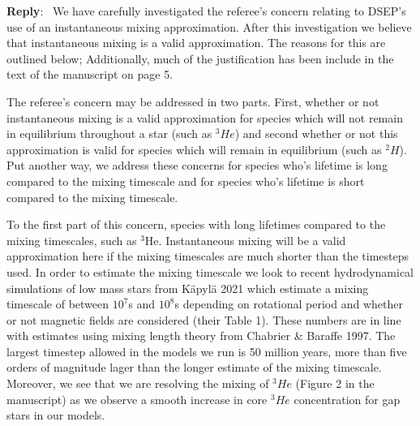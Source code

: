 \documentclass[11pt]{article}
\newcounter{reviewer}
\newcounter{point}[reviewer]
\newenvironment{reply}
   {\medskip \noindent \begin{sf}\textbf{Reply}:\  }
   {\medskip \end{sf}}
\begin{document}
\begin{reply}
	We have carefully investigated the referee's concern relating to DSEP's
	use of an instantaneous mixing approximation. After this investigation
	we believe that instantaneous mixing is a valid approximation. The reasons
	for this are outlined below; Additionally, much of the justification has been
	include in the text of the manuscript on page 5.


	The referee's concern may be addressed in two parts. First, whether or not
	instantaneous mixing is a valid approximation for species which will not
	remain in equilibrium throughout a star (such as $^{3}He$) and second
	whether or not this approximation is valid for species which will remain in
	equilibrium (such as $^{2}H$). Put another way, we address these concerns
	for species who's lifetime is long compared to the mixing timescale and for
	species who's lifetime is short compared to the mixing timescale. 

	To the first part of this concern, species with long lifetimes compared to
	the mixing timescales, such as $^{3}$He. Instantaneous mixing will be a
	valid approximation here if the mixing timescales are much shorter than the
	timesteps used. In order to estimate the mixing timescale we look to recent
	hydrodynamical simulations of low mass stars from K\"apyl\"a 2021 which
	estimate a mixing timescale of between $10^{7}$s and $10^{8}$s depending on
	rotational period and whether or not magnetic fields are considered (their
	Table 1). These numbers are in line with estimates using mixing length
	theory from Chabrier \& Baraffe 1997. The largest timestep allowed in the
	models we run is 50 million years, more than five orders of magnitude lager
	than the longer estimate of the mixing timescale. Moreover, we see that we are
	resolving the mixing of $^{3}He$ (Figure 2 in the manuscript) as we observe a
	smooth increase in core $^{3}He$ concentration for gap stars in our models. 


\end{reply}
\end{document}
